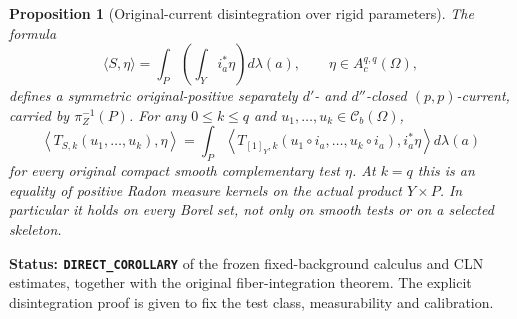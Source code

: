 \documentclass[11pt,a4paper]{article}
\numberwithin{equation}{section}
\newtheorem{proposition}[theorem]{Proposition}
\theoremstyle{definition}
\theoremstyle{remark}
\begin{document}
\begin{proposition}[Original-current disintegration over rigid parameters]
\label{prop:r6-fiber-current-disintegration}
The formula
\begin{equation}
       \langle S,\eta\rangle
          =\int_P\left(\int_Y i_a^*\eta\right)d\lambda(a),
       \qquad \eta\in A_c^{q,q}(\Omega),
\label{eq:r6-laminar-current}
\end{equation}
defines a symmetric original-positive separately $d'$- and $d''$-closed
$(p,p)$-current, carried by $\pi_Z^{-1}(P)$.
For any $0\leq k\leq q$ and $u_1,\ldots,u_k\in\mathcal C_b(\Omega)$,
\begin{equation}
 \left\langle T_{S,k}(u_1,\ldots,u_k),\eta\right\rangle
   =\int_P
       \left\langle
          T_{[1]_Y,k}(u_1\circ i_a,\ldots,u_k\circ i_a),
                       i_a^*\eta\right\rangle d\lambda(a)
\label{eq:r6-fiber-bt-disintegration}
\end{equation}
for every original compact smooth complementary test $\eta$.
At $k=q$ this is an equality of positive Radon measure kernels on the
actual product $Y\times P$. In particular it holds on every Borel set,
not only on smooth tests or on a selected skeleton.
\end{proposition}

\noindent\textbf{Status: \texttt{DIRECT\_COROLLARY}} of the frozen
fixed-background calculus and CLN estimates, together with the original
fiber-integration theorem. The explicit disintegration proof is given
to fix the test class, measurability and calibration.
\end{document}
